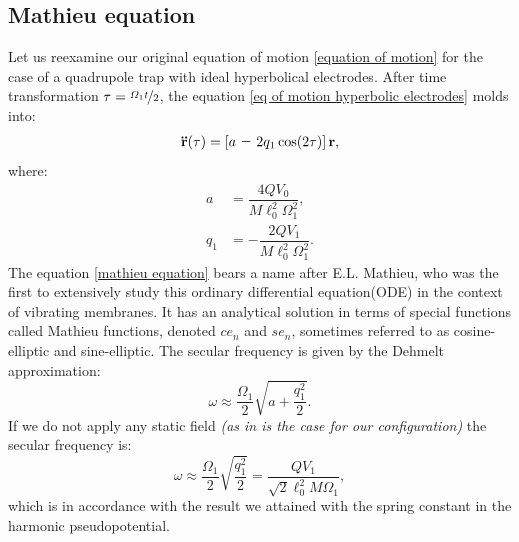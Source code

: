 \subsection{Mathieu equation}
\label{sec:mathieu equation}
Let us reexamine our original equation of motion \eqref{equation of motion} for the case of a quadrupole trap with ideal hyperbolical electrodes. After time transformation $\tau = \nicefrac{\Omega_1 t}{2}$, the equation \eqref{eq of motion hyperbolic electrodes} molds into:
\begin{equation}
	\label{mathieu equation}
	\vb{\ddot{r}}(\tau) = \left[a \minus 2 q_1 \cos(2 \tau)\right] \vb{r},
\end{equation}
where:
\begin{subequations}
\begin{align}
	a &= \dfrac{4 Q V_0}{M \ell_0^2 \Omega_1^2}, \\
	q_1 &= \minus\dfrac{2 Q V_1}{M \ell_0^2 \Omega_1^2}.
\end{align}
\end{subequations}
The equation \eqref{mathieu equation} bears a name after E.L. Mathieu, who was the first to extensively study this ordinary differential equation(ODE) in the context of vibrating membranes. It has an analytical solution \cite{5416839} in terms of special functions called Mathieu functions, denoted $ce_n$ and $se_n$, sometimes referred to as cosine-elliptic and sine-elliptic. The secular frequency is given by \cite{gerlich1992inhomogeneous} the Dehmelt approximation:
\begin{equation}
	\omega \approx \frac{\Omega_1}{2} \sqrt{a + \frac{q_1^2}{2}}.
\end{equation}
If we do not apply any static field \textit{(as in is the case for our configuration)} the secular frequency is:
\begin{equation}
	\omega \approx \frac{\Omega_1}{2} \sqrt{\dfrac{q_1^2}{2}} = \dfrac{Q V_1}{\sqrt{2}\ell_0^2 M \Omega_1},
\end{equation}
which is in accordance with the result we attained with the spring constant in the harmonic pseudopotential.

